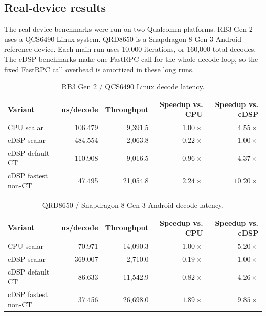 \documentclass[runningheads]{llncs}
\begin{document}
\subsection{Real-device results}

The real-device benchmarks were run on two Qualcomm platforms.  RB3 Gen 2
uses a QCS6490 Linux system.  QRD8650 is a Snapdragon 8 Gen 3 Android
reference device.  Each main run uses 10,000 iterations, or 160,000 total
decodes.  The cDSP benchmarks make one FastRPC call for the whole decode loop,
so the fixed FastRPC call overhead is amortized in these long runs.

\begin{table}[t]
\centering
\caption{RB3 Gen 2 / QCS6490 Linux decode latency.}
\label{tab:rb3-results}
\small
\begin{tabular}{lrrrr}
\toprule
Variant & us/decode & Throughput & Speedup vs. CPU & Speedup vs. cDSP \\
\midrule
CPU scalar & 106.479 & 9,391.5 & \(1.00\times\) & \(4.55\times\) \\
cDSP scalar & 484.554 & 2,063.8 & \(0.22\times\) & \(1.00\times\) \\
cDSP default CT & 110.908 & 9,016.5 & \(0.96\times\) & \(4.37\times\) \\
cDSP fastest non-CT & 47.495 & 21,054.8 & \(2.24\times\) & \(10.20\times\) \\
\bottomrule
\end{tabular}
\end{table}

\begin{table}[t]
\centering
\caption{QRD8650 / Snapdragon 8 Gen 3 Android decode latency.}
\label{tab:qrd8650-results}
\small
\begin{tabular}{lrrrr}
\toprule
Variant & us/decode & Throughput & Speedup vs. CPU & Speedup vs. cDSP \\
\midrule
CPU scalar & 70.971 & 14,090.3 & \(1.00\times\) & \(5.20\times\) \\
cDSP scalar & 369.007 & 2,710.0 & \(0.19\times\) & \(1.00\times\) \\
cDSP default CT & 86.633 & 11,542.9 & \(0.82\times\) & \(4.26\times\) \\
cDSP fastest non-CT & 37.456 & 26,698.0 & \(1.89\times\) & \(9.85\times\) \\
\bottomrule
\end{tabular}
\end{table}
\end{document}
